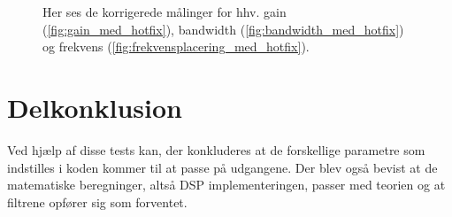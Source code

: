 \begin{figure}[h!]
	\centering
  	\caption{Her ses de korrigerede målinger for hhv. gain (\ref{fig:gain_med_hotfix}), bandwidth (\ref{fig:bandwidth_med_hotfix}) og frekvens (\ref{fig:frekvensplacering_med_hotfix}).}
	\label{fig:korr}
\end{figure}




\section{Delkonklusion}

Ved hjælp af disse tests kan, der konkluderes at de forskellige parametre som indstilles i koden kommer til at passe på udgangene. Der blev også bevist at de matematiske beregninger, altså DSP implementeringen, passer med teorien og at filtrene opfører sig som forventet. \\

